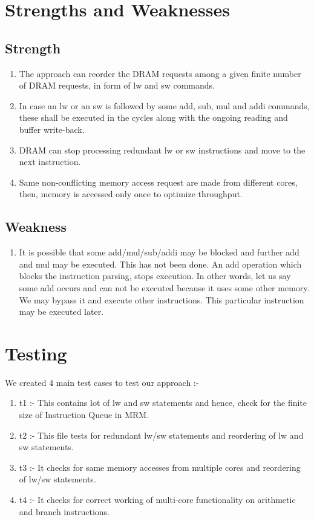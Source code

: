 \documentclass{article} %
\begin{document}
\section{Strengths and Weaknesses}
\subsection{Strength}
\begin{enumerate}
    \item The approach can reorder the DRAM requests among a given finite number of DRAM requests, in form of lw and sw commands.
    \item In case an lw or an sw is followed by some add, sub, mul and addi commands, these shall be executed in the cycles along with the ongoing reading and buffer write-back.
    \item DRAM can stop processing redundant lw or sw instructions and move to the next instruction.
    \item Same non-conflicting memory access request are made from different cores, then, memory is accessed only once to optimize throughput.
\end{enumerate}
\subsection{Weakness}
\begin{enumerate}
    \item It is possible that some add/mul/sub/addi may be blocked and further add and mul may be executed. This has not been done. An add operation which blocks the instruction parsing, stops execution. In other words, let us say some add occurs and can not be executed because it uses some other memory. We may bypass it and execute other instructions. This particular instruction may be executed later.
\end{enumerate}

\section{Testing}
We created 4 main test cases to test our approach :-
\begin{enumerate}
    \item t1 :- This contains lot of lw and sw statements and hence, check for the finite size of Instruction Queue in MRM.
    \item t2 :- This file tests for redundant lw/sw statements and reordering of lw and sw statements.
    \item t3 :- It checks for same memory accesses from multiple cores and reordering of lw/sw statements.
    \item t4 :- It checks for correct working of multi-core functionality on arithmetic and branch instructions. 
\end{enumerate}
\end{document}
